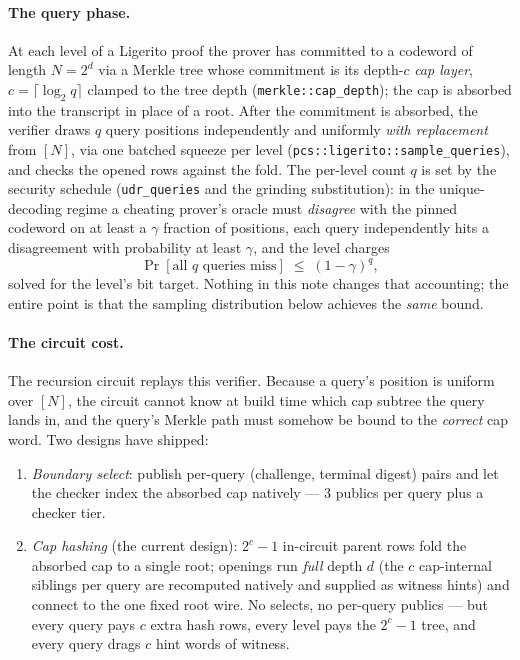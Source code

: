 \documentclass[11pt]{article}
\newcommand{\code}[1]{\texttt{#1}}
\theoremstyle{definition}
\begin{document}
\paragraph{The query phase.}
At each level of a Ligerito proof the prover has committed to a codeword
of length $N = 2^d$ via a Merkle tree whose commitment is its depth-$c$
\emph{cap layer}, $c = \lceil \log_2 q \rceil$ clamped to the tree depth
(\code{merkle::cap\_depth}); the cap is absorbed into the transcript in
place of a root. After the commitment is absorbed, the verifier draws
$q$ query positions independently and uniformly \emph{with replacement}
from $[N]$, via one batched squeeze per level
(\code{pcs::ligerito::sample\_queries}), and checks the opened rows
against the fold. The per-level count $q$ is set by the security
schedule (\code{udr\_queries} and the grinding substitution): in the
unique-decoding regime a cheating prover's oracle must \emph{disagree}
with the pinned codeword on at least a $\gamma$ fraction of positions,
each query independently hits a disagreement with probability at least
$\gamma$, and the level charges
\[
\Pr[\text{all $q$ queries miss}] \;\le\; (1-\gamma)^q ,
\]
solved for the level's bit target. Nothing in this note changes that
accounting; the entire point is that the sampling distribution below
achieves the \emph{same} bound.

\paragraph{The circuit cost.}
The recursion circuit replays this verifier. Because a query's position
is uniform over $[N]$, the circuit cannot know at build time which cap
subtree the query lands in, and the query's Merkle path must somehow be
bound to the \emph{correct} cap word. Two designs have shipped:

\begin{enumerate}[leftmargin=2em]
\item \emph{Boundary select}: publish per-query (challenge, terminal
digest) pairs and let the checker index the absorbed cap natively ---
$3$ publics per query plus a checker tier.
\item \emph{Cap hashing} (the current design): $2^c - 1$ in-circuit
parent rows fold the absorbed cap to a single root; openings run
\emph{full} depth $d$ (the $c$ cap-internal siblings per query are
recomputed natively and supplied as witness hints) and connect to the
one fixed root wire. No selects, no per-query publics --- but every
query pays $c$ extra hash rows, every level pays the $2^c-1$ tree, and
every query drags $c$ hint words of witness.
\end{enumerate}
\end{document}
